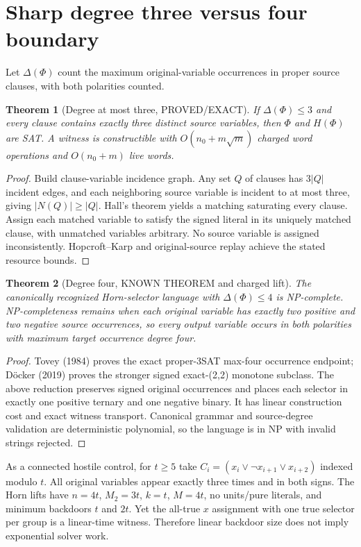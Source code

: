 \documentclass[11pt]{article}
\newtheorem{theorem}{Theorem}
\begin{document}
\section{Sharp degree three versus four boundary}
Let $\Delta(\Phi)$ count the maximum original-variable occurrences in proper source clauses, with both polarities counted.
\begin{theorem}[Degree at most three, PROVED/EXACT]
If $\Delta(\Phi)\le3$ and every clause contains exactly three distinct source variables, then $\Phi$ and $H(\Phi)$ are SAT. A witness is constructible with $O(n_0+m\sqrt m)$ charged word operations and $O(n_0+m)$ live words.
\end{theorem}
\begin{proof}
Build clause-variable incidence graph. Any set $Q$ of clauses has $3|Q|$ incident edges, and each neighboring source variable is incident to at most three, giving $|N(Q)|\ge |Q|$. Hall's theorem yields a matching saturating every clause. Assign each matched variable to satisfy the signed literal in its uniquely matched clause, with unmatched variables arbitrary. No source variable is assigned inconsistently. Hopcroft--Karp and original-source replay achieve the stated resource bounds.
\end{proof}
\begin{theorem}[Degree four, KNOWN THEOREM and charged lift]
The canonically recognized Horn-selector language with $\Delta(\Phi)\le4$ is NP-complete. NP-completeness remains when each original variable has exactly two positive and two negative source occurrences, so every output variable occurs in both polarities with maximum target occurrence degree four.
\end{theorem}
\begin{proof}
Tovey (1984) proves the exact proper-3SAT max-four occurrence endpoint; D\"ocker (2019) proves the stronger signed exact-(2,2) monotone subclass. The above reduction preserves signed original occurrences and places each selector in exactly one positive ternary and one negative binary. It has linear construction cost and exact witness transport. Canonical grammar and source-degree validation are deterministic polynomial, so the language is in NP with invalid strings rejected.
\end{proof}
As a connected hostile control, for $t\ge5$ take $C_i=(x_i\vee\neg x_{i+1}\vee x_{i+2})$ indexed modulo $t$. All original variables appear exactly three times and in both signs. The Horn lifts have $n=4t$, $M_2=3t$, $k=t$, $M=4t$, no units/pure literals, and minimum backdoors $t$ and $2t$. Yet the all-true $x$ assignment with one true selector per group is a linear-time witness. Therefore linear backdoor size does not imply exponential solver work.
\end{document}
